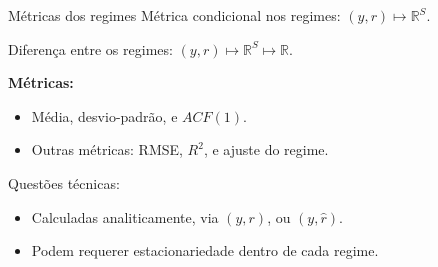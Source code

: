 \documentclass[
  ignorenonframetext,
  brazilian,
]{beamer}
\providecommand{\tightlist}{%
  \setlength{\itemsep}{0pt}\setlength{\parskip}{0pt}}\usepackage{longtable,booktabs,array}
\begin{document}
\begin{frame}{Métricas dos regimes}
\label{muxe9tricas-dos-regimes}
Métrica condicional nos regimes: \((y, r) \mapsto \mathbb{R}^{S}\).

Diferença entre os regimes:
\((y, r) \mapsto \mathbb{R}^{S} \mapsto \mathbb{R}\).

\pause

\textbf{Métricas:}

\begin{itemize}
\tightlist
\item
  Média, desvio-padrão, e \(ACF(1)\).
\item
  Outras métricas: RMSE, \(R^{2}\), e ajuste do regime.
\end{itemize}

\pause

Questões técnicas:

\begin{itemize}
\tightlist
\item
  Calculadas analiticamente, via \((y, r)\), ou \((y, \hat{r})\).
\item
  Podem requerer estacionariedade dentro de cada regime.
\end{itemize}
\end{frame}
\end{document}
